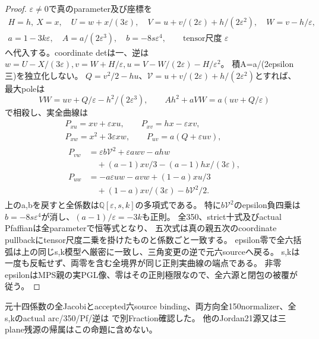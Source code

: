\documentclass[a4paper,11pt]{ltjsarticle}
\theoremstyle{definition}
\begin{document}
\begin{proof}
$\varepsilon\ne0$で真のparameter及び座標を
\[
\begin{gathered}
 H=h,\ X=x,\quad U=w+x/(3\varepsilon),\quad
 V=u+v/(2\varepsilon)+h/(2\varepsilon^2),\quad W=v-h/\varepsilon,\\
 a=1-3k\varepsilon,\quad A=a/(2\varepsilon^3),\quad b=-8s\varepsilon^4,
 \qquad\text{tensor尺度 }\varepsilon
\end{gathered}
\]
へ代入する。coordinate detは一、逆は
$w=U-X/(3\varepsilon),v=W+H/\varepsilon,u=V-W/(2\varepsilon)-H/\varepsilon^2$。
積A=a/(2epsilon三)を独立化しない。
$Q=v^2/2-hu$、$\mathcal V=u+v/(2\varepsilon)+h/(2\varepsilon^2)$とすれば、
最大poleは
\[
 VW=uv+Q/\varepsilon-h^2/(2\varepsilon^3),\qquad
 Ah^2+aVW=a(uv+Q/\varepsilon)
\]
で相殺し、実全曲線は
\[
\begin{gathered}
 P_{xu}=xv+\varepsilon xu,\qquad P_{xv}=hx-\varepsilon xv,\\
 P_{xw}=x^2+3\varepsilon xw,\qquad P_{uv}=a(Q+\varepsilon uv),\\
\begin{aligned}
 P_{vw}&=\varepsilon b\mathcal V^2+\varepsilon awv-ahw\\
       &\quad +(a-1)xv/3-(a-1)hx/(3\varepsilon),\\
 P_{uw}&=-a\varepsilon uw-avw+(1-a)xu/3\\
       &\quad +(1-a)xv/(3\varepsilon)-b\mathcal V^2/2.
\end{aligned}
\end{gathered}
\]
上のa,bを戻すと全係数は$\mathbb Q[\varepsilon,s,k]$の多項式である。
特に$b\mathcal V^2$のepsilon負四乗は$b=-8s\varepsilon^4$が消し、$(a-1)/\varepsilon=-3k$も正則。
全350、strict十式及びactual Pfaffianは全parameterで恒等式となり、
五次式は真の親五次のcoordinate pullbackにtensor尺度二乗を掛けたものと係数ごと一致する。
epsilon零で全六括弧は上の同じs,k模型へ厳密に一致し、三角変更の逆で元六sourceへ戻る。
s,kは一度も反転せず、両零を含む全境界が同じ正則実曲線の端点である。
非零epsilonはMPS親の実PGL像、零はその正則極限なので、全六源と閉包の被覆が従う。
\end{proof}
元十四係数の全Jacobiとaccepted六source binding、両方向全150normalizer、全s,kのactual arc/350/Pf/逆は
で別Fraction確認した。
他のJordan21源又は三plane残源の帰属はこの命題に含めない。
\end{document}
